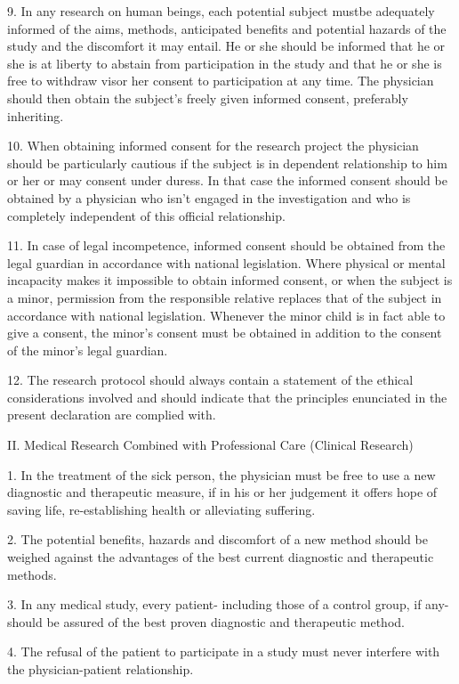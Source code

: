 {{   9. In any research on human beings, each potential subject mustbe adequately informed of the aims, methods, anticipated benefits and potential hazards of the study and the discomfort it may entail. He or she should be informed that he or she is at liberty to abstain from participation in the study and that he or she is free to withdraw visor her consent to participation at any time. The physician should then obtain the subject's freely given informed consent, preferably inheriting.

  10. When obtaining informed consent for the research project the physician should be particularly cautious if the subject is in dependent relationship to him or her or may consent under duress. In that case the informed consent should be obtained by a physician who isn't engaged in the investigation and who is completely independent of this official relationship.

  11. In case of legal incompetence, informed consent should be obtained from the legal guardian in accordance with national legislation. Where physical or mental incapacity makes it impossible to obtain informed consent, or when the subject is a minor, permission from the responsible relative replaces that of the subject in accordance with national legislation. Whenever the minor child is in fact able to give a consent, the minor's consent must be obtained in addition to the consent of the minor's legal guardian.

  12. The research protocol should always contain a statement of the ethical considerations involved and should indicate that the principles enunciated in the present declaration are complied with.

II. Medical Research Combined with Professional Care (Clinical Research)

   1. In the treatment of the sick person, the physician must be free to use a new diagnostic and therapeutic measure, if in his or her judgement it offers hope of saving life, re-establishing health or alleviating suffering.

   2. The potential benefits, hazards and discomfort of a new method should be weighed against the advantages of the best current diagnostic and therapeutic methods.

   3. In any medical study, every patient- including those of a control group, if any- should be assured of the best proven diagnostic and therapeutic method.

   4. The refusal of the patient to participate in a study must never interfere with the physician-patient relationship.

}}
